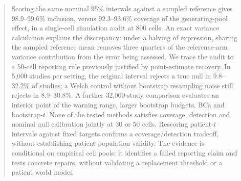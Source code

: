 \begin{abstract}
Scoring the same nominal 95\% intervals against a sampled reference gives
98.9--99.6\% inclusion, versus 92.3--93.6\% coverage of the generating-pool
effect, in a single-cell simulation audit at 800 cells. An exact variance
calculation explains the discrepancy: under a halving of expression, sharing
the sampled reference mean removes three quarters of the reference-arm
variance contribution from the error being assessed. We trace the audit to
a 50-cell reporting rule previously justified by point-estimate recovery.
In 5{,}000 studies per setting, the original interval rejects a true null
in 9.8--32.2\% of studies; a Welch control without bootstrap resampling noise
still rejects in 8.9--30.8\%. A further 32{,}000-study comparison evaluates
an interior point of the warning range, larger bootstrap budgets, BCa and
bootstrap-$t$. None of the tested methods satisfies coverage, detection and
nominal null calibration jointly at 30 or 50 cells. Rescoring patient-$t$ intervals against fixed targets confirms a
coverage/detection tradeoff, without establishing patient-population validity.
The evidence is conditional on empirical cell pools: it identifies a failed
reporting claim and tests concrete repairs, without validating a replacement
threshold or a patient world model.
\end{abstract}
